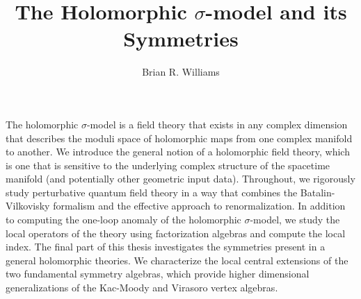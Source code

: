 \documentclass[12pt]{nuthesis}	%
\author{Brian R. Williams}
\title{The Holomorphic $\sigma$-model and its Symmetries}
\begin{document}
%	
%


\frontmatter		%

\maketitle		%

\copyrightpage		%


\abstract		%

The holomorphic $\sigma$-model is a field theory that exists in any complex dimension that describes the moduli space of holomorphic maps from one complex manifold to another. 
We introduce the general notion of a holomorphic field theory, which is one that is sensitive to the underlying complex structure of the spacetime manifold (and potentially other geometric input data). 
Throughout, we rigorously study perturbative quantum field theory in a way that combines the Batalin-Vilkovisky formalism and the effective approach to renormalization. 
In addition to computing the one-loop anomaly of the holomorphic $\sigma$-model, we study the local operators of the theory using factorization algebras and compute the local index.
The final part of this thesis investigates the symmetries present in a general holomorphic theories.
We characterize the local central extensions of the two fundamental symmetry algebras, which provide higher dimensional generalizations of the Kac-Moody and Virasoro vertex algebras. 

\acknowledgements	%






%
%
%
%
%
%
%
%

\clearpage{} %
\tableofcontents	%
\end{document}
